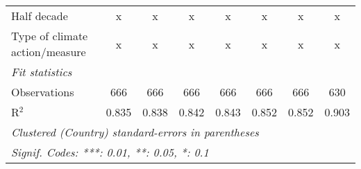 \begin{table}[htbp]
\begin{tabular}{lccccccc}
      Half decade                                                             & x              & x              & x              & x              & x              & x              & x\\  
      Type of climate action/measure                                          & x              & x              & x              & x              & x              & x              & x\\  
      \midrule \emph{Fit statistics}\\
      Observations                                                            & 666            & 666            & 666            & 666            & 666            & 666            & 630\\  
      R$^2$                                                                   & 0.835          & 0.838          & 0.842          & 0.843          & 0.852          & 0.852          & 0.903\\  
      \midrule
      \multicolumn{8}{l}{\emph{Clustered (Country) standard-errors in parentheses}}\\
      \multicolumn{8}{l}{\emph{Signif. Codes: ***: 0.01, **: 0.05, *: 0.1}}\\
   \end{tabular}
\end{table}



